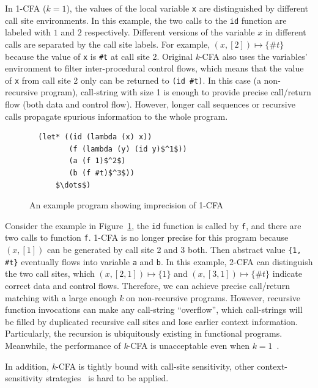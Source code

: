 \documentclass[12pt]{report}
\begin{document}
In 1-CFA ($k = 1$), the values of the local variable \verb|x| are distinguished by different call site environments.
In this example, the two calls to the \verb|id| function are labeled with $1$ and $2$ respectively.
Different versions of the variable $x$ in different calls are separated by the call site labels.
For example, $(x, [2]) \mapsto \{\#t\}$ because the value of \verb|x| is \verb|#t| at call site 2.
Original \textit{k}-CFA also uses the variables' environment to filter inter-procedural control flows,
which means that the value of \verb|x| from call site 2 only can be returned to \verb|(id #t)|.
In this case (a non-recursive program), call-string with size 1 is enough to provide precise call/return flow
(both data and control flow).
However, longer call sequences or recursive calls propagate spurious information to the whole program.

\begin{figure}
\begin{lstlisting}
  (let* ((id (lambda (x) x))
         (f (lambda (y) (id y)$^1$))
         (a (f 1)$^2$)
         (b (f #t)$^3$))
      $\dots$)
\end{lstlisting}
\caption{An example program showing imprecision of 1-CFA}
\label{fig:eg2}
\end{figure}

Consider the example in Figure~\ref{fig:eg2}, the \verb|id| function is called by \verb|f|, and there are two calls to function \verb|f|.
1-CFA is no longer precise for this program because $(x, [1])$ can be generated by call site 2 and 3 both.
Then abstract value \verb|{1, #t}| eventually flows into variable \verb|a| and \verb|b|.
In this example, 2-CFA can distinguish the two call sites, which $(x, [2, 1]) \mapsto \{1\}$ and $(x, [3, 1]) \mapsto  \{\#t\}$ indicate correct data and control flows.
Therefore, we can achieve precise call/return matching with a large enough \textit{k} on non-recursive programs.
However, recursive function invocations can make any call-string ``overflow'', which call-strings will be filled by duplicated recursive call sites and lose earlier context information.
Particularly, the recursion is ubiquitously existing in functional programs.
Meanwhile, the performance of \textit{k}-CFA is unacceptable even when $k = 1$~\cite{van2008deciding}.

In addition, \textit{k}-CFA is tightly bound with call-site sensitivity, other context-sensitivity strategies~\cite{agesen1995cartesian, milanova2005parameterized,smaragdakis2011pick, lhotak2003scaling, wright1998polymorphic} is hard to be applied.
\end{document}
